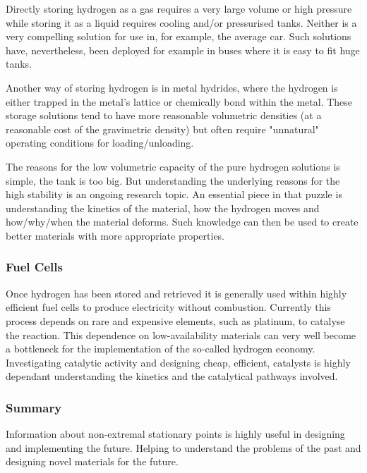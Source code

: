 Directly storing hydrogen as a gas requires a very large volume or high pressure while storing it as a liquid requires cooling and/or pressurised tanks.
Neither is a very compelling solution for use in, for example, the average car.
Such solutions have, nevertheless, been deployed for example in buses where it is easy to fit huge tanks.~\citemiss

Another way of storing hydrogen is in metal hydrides, where the hydrogen is either trapped in the metal's lattice or chemically bond within the metal.
These storage solutions tend to have more reasonable volumetric densities (at a reasonable cost of the gravimetric density)  but often require "unnatural" operating conditions for loading/unloading.

The reasons for the low volumetric capacity of the pure hydrogen solutions is simple, the tank is too big.
But understanding the underlying reasons for the high stability is an ongoing research topic.
An essential piece in that puzzle is understanding the kinetics of the material, how the hydrogen moves and how/why/when the material deforms.
Such knowledge can then be used to create better materials with more appropriate properties.

\subsubsection{Fuel Cells}
Once hydrogen has been stored and retrieved it is generally used within highly efficient fuel cells to produce electricity without combustion.\citemiss
Currently this process depends on rare and expensive elements, such as platinum, to catalyse the reaction.
This dependence on low-availability materials can very well become a bottleneck for the implementation of the so-called hydrogen economy.
Investigating catalytic activity and designing cheap, efficient, catalysts is highly dependant understanding the kinetics and the catalytical pathways involved.

\subsubsection{Summary}
Information about non-extremal stationary points is highly useful in designing and implementing the future.
Helping to understand the problems of the past and designing novel materials for the future.




